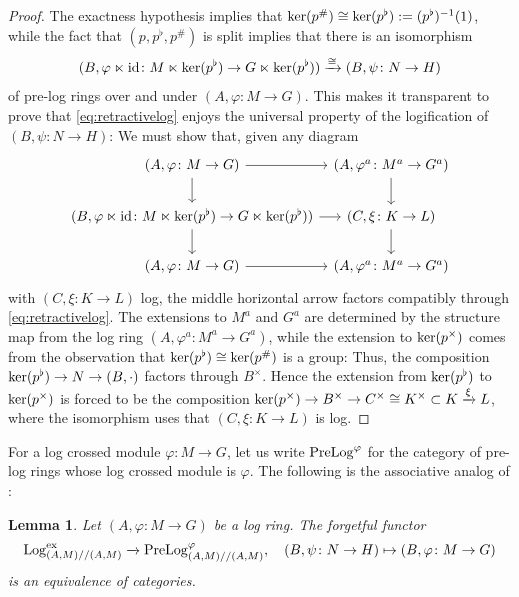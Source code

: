 \documentclass[a4paper,10pt%
]{amsart}
\numberwithin{equation}{section}
\newtheorem{lemma}[subsection]{Lemma}
\theoremstyle{definition}
\renewcommand{\:}{\colon}
\begin{document}
\begin{proof} The exactness hypothesis implies that ${\rm ker}(p^\#) \cong {\rm ker}(p^\flat) := (p^{\flat})^{-1}(1)$, while the fact that $(p, p^\flat, p^\#)$ is split implies that there is an isomorphism \[(B, \varphi \ltimes {\rm id} \colon M \ltimes {\rm ker}(p^\flat) \to G \ltimes {\rm ker}(p^\flat)) \xrightarrow{\cong} (B, \psi \colon N \to H)\] of pre-log rings over and under $(A, \varphi \colon M \to G)$. This makes it transparent to prove that \eqref{eq:retractivelog} enjoys the universal property of the logification of $(B, \psi \colon N \to H)$: We must show that, given any diagram \[\begin{tikzcd}[column sep = tiny](A, \varphi \colon M \to G) \ar{d} \ar{r} & (A, \varphi^a \colon M^a \to G^a) \ar{d} \\ (B, \varphi \ltimes {\rm id} \colon M \ltimes {\rm ker}(p^\flat) \to G \ltimes {\rm ker}(p^\flat)) \ar{r} \ar{d} & (C,\xi \colon K \to L) \ar{d} \\ (A, \varphi \colon M \to G) \ar{r} & (A, \varphi^a \colon M^a \to G^a) \end{tikzcd} \] with $(C, \xi \colon K \to L)$ log, the middle horizontal arrow factors compatibly through \eqref{eq:retractivelog}. The extensions to $M^a$ and $G^a$ are determined by the structure map from the log ring $(A, \varphi^a \colon M^a \to G^a)$, while the extension to ${\rm ker}(p^\times)$ comes from the observation that ${\rm ker}(p^\flat) \cong {\rm ker}(p^\#)$ is a group: Thus, the composition ${\rm ker}(p^\flat) \to N \to (B, \cdot)$ factors through $B^\times$. Hence the extension from ${\rm ker}(p^\flat)$ to ${\rm ker}(p^\times)$ is forced to be the composition ${\rm ker}(p^\times) \to B^\times \to C^\times \cong K^\times \subset K \xrightarrow{\xi} L$, where the isomorphism uses that $(C, \xi \colon K \to L)$ is log.  
\end{proof}

For a log crossed module $\varphi \colon M \to G$, let us write ${\rm PreLog}^{\varphi}$ for the category of pre-log rings whose log crossed module is $\varphi$. The following is the associative analog of \cite[Corollary 2.14]{Lun25}:

\begin{lemma}\label{lem:forgetfulphi} Let $(A, \varphi \colon M \to G)$ be a log ring. The forgetful functor \[{\rm Log}^{\rm ex}_{(A, M) // (A, M)} \xrightarrow{} {\rm PreLog}^{\varphi}_{(A, M) // (A, M)}, \quad (B, \psi \colon N \to H) \mapsto (B, \varphi \colon M \to G)\] is an equivalence of categories. 
\end{lemma}
\end{document}
